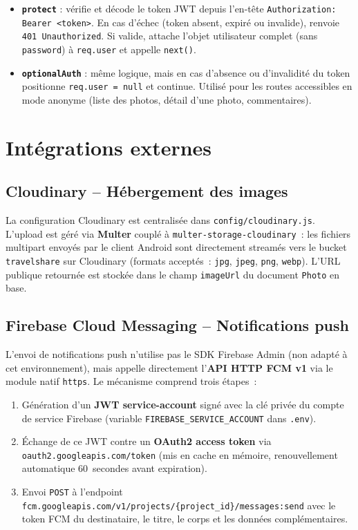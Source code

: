 \documentclass[12pt, a4paper, openany]{report}
\begin{document}
\begin{itemize}
  \item \textbf{\texttt{protect}} : vérifie et décode le token JWT depuis l'en-tête
        \texttt{Authorization: Bearer <token>}. En cas d'échec (token absent, expiré ou
        invalide), renvoie \texttt{401 Unauthorized}. Si valide, attache l'objet utilisateur
        complet (sans \texttt{password}) à \texttt{req.user} et appelle \texttt{next()}.
  \item \textbf{\texttt{optionalAuth}} : même logique, mais en cas d'absence ou d'invalidité
        du token positionne \texttt{req.user = null} et continue. Utilisé pour les routes
        accessibles en mode anonyme (liste des photos, détail d'une photo, commentaires).
\end{itemize}

\section{Intégrations externes}

\subsection{Cloudinary -- Hébergement des images}

La configuration Cloudinary est centralisée dans \texttt{config/cloudinary.js}.
L'upload est géré via \textbf{Multer} couplé à \texttt{multer-storage-cloudinary}~: les
fichiers multipart envoyés par le client Android sont directement streamés vers le bucket
\texttt{travelshare} sur Cloudinary (formats acceptés~: \texttt{jpg}, \texttt{jpeg},
\texttt{png}, \texttt{webp}). L'URL publique retournée est stockée dans le champ
\texttt{imageUrl} du document \texttt{Photo} en base.

\subsection{Firebase Cloud Messaging -- Notifications push}

L'envoi de notifications push n'utilise pas le SDK Firebase Admin (non adapté à cet
environnement), mais appelle directement l'\textbf{API HTTP FCM v1} via le module natif
\texttt{https}. Le mécanisme comprend trois étapes~:

\begin{enumerate}
  \item Génération d'un \textbf{JWT service-account} signé avec la clé privée du compte de
        service Firebase (variable \texttt{FIREBASE\_SERVICE\_ACCOUNT} dans \texttt{.env}).
  \item Échange de ce JWT contre un \textbf{OAuth2 access token} via
        \texttt{oauth2.googleapis.com/token} (mis en cache en mémoire, renouvellement
        automatique 60~secondes avant expiration).
  \item Envoi \texttt{POST} à l'endpoint
        \texttt{fcm.googleapis.com/v1/projects/\{project\_id\}/messages:send} avec le
        token FCM du destinataire, le titre, le corps et les données complémentaires.
\end{enumerate}
\end{document}
